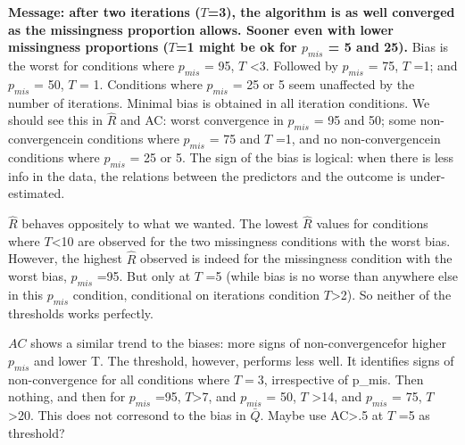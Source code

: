 \documentclass[Royal,times,sageh]{sagej}
\begin{document}
\textbf{Message: after two iterations (\(T\)=3), the algorithm is as
well converged as the missingness proportion allows. Sooner even with
lower missingness proportions (\(T\)=1 might be ok for \(p_{mis}\) = 5
and 25).} Bias is the worst for conditions where \(p_{mis}\) = 95, \(T\)
\textless3. Followed by \(p_{mis}\) = 75, \(T\) =1; and \(p_{mis}\) =
50, \(T\) = 1. Conditions where \(p_{mis}\) = 25 or 5 seem unaffected by
the number of iterations. Minimal bias is obtained in all iteration
conditions. We should see this in \(\widehat{R}\) and AC: worst
convergence in \(p_{mis}\) = 95 and 50; some non-convergencein
conditions where \(p_{mis}\) = 75 and \(T\) =1, and no non-convergencein
conditions where \(p_{mis}\) = 25 or 5. The sign of the bias is logical:
when there is less info in the data, the relations between the
predictors and the outcome is under-estimated.

\(\widehat{R}\) behaves oppositely to what we wanted. The lowest
\(\widehat{R}\) values for conditions where \(T\)\textless10 are
observed for the two missingness conditions with the worst bias.
However, the highest \(\widehat{R}\) observed is indeed for the
missingness condition with the worst bias, \(p_{mis}\) =95. But only at
\(T\) =5 (while bias is no worse than anywhere else in this \(p_{mis}\)
condition, conditional on iterations condition \(T\)\textgreater2). So
neither of the thresholds works perfectly.

\(AC\) shows a similar trend to the biases: more signs of
non-convergencefor higher \(p_{mis}\) and lower T. The threshold,
however, performs less well. It identifies signs of non-convergence for
all conditions where \(T=3\), irrespective of p\_mis. Then nothing, and
then for \(p_{mis}\) =95, \(T\)\textgreater7, and \(p_{mis}\) = 50,
\(T\) \textgreater14, and \(p_{mis}\) = 75, \(T\)\textgreater20. This
does not corresond to the bias in \(\bar{Q}\). Maybe use
AC\textgreater.5 at \(T\) =5 as threshold?
\end{document}
